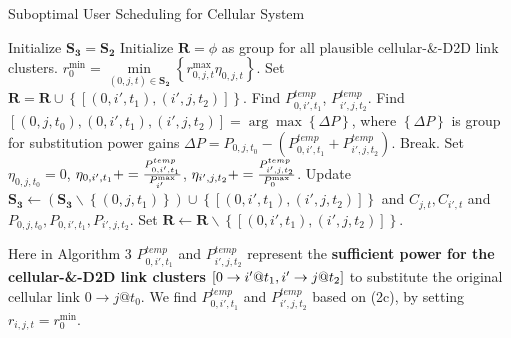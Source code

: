 \documentclass{ieeeaccess}
\begin{document}
\begin{algorithm}[!h]
\caption{Suboptimal User Scheduling for Cellular System}
\label{alg:1}
\begin{algorithmic}[1]
\STATE Initialize ${{\mathbf{S}}_{\mathbf{3}}}={{\mathbf{S}}_{\mathbf{2}}}$
  \STATE Initialize ${\mathbf{R}} = \phi $ as group for all plausible cellular-\&-D2D link clusters.
  \STATE $r_0^{\min } = \mathop {\min }\limits_{\left( {0,j,t} \right) \in {{\mathbf{S}}_{\mathbf{2}}}} \left\{ {r_{0,j,t}^{\max }{\eta _{0,j,t}}} \right\}$.
            \STATE Set ${\mathbf{R = R}} \cup \left\{ {\left[ {\left( {0,i',{t_1}} \right),\left( {i',j,{t_2}} \right)} \right]} \right\}$.
          \ENDIF
        \ENDFOR
      \ENDIF
    \ENDFOR
  \ENDFOR
    \STATE Find ${P_{0,i',{t_1}}^{temp}}$, ${P_{i',j,{t_2}}^{temp}}$. 
    \STATE Find $\left[ {\left( {0,j,{t_0}} \right),\left( {0,i',{t_1}} \right),\left( {i',j,{t_2}} \right)} \right] = \arg \max \left\{ {\Delta P} \right\}$, where ${\left\{ {\Delta P} \right\}}$ is group for substitution power gains $\Delta P = {P_{0,j,{t_0}}} - \left( {{P_{0,i',{t_1}}^{temp}} + {P_{i',j,{t_2}}^{temp}}} \right)$. 
      \STATE Break.
    \ENDIF
    \STATE Set ${\eta _{0,j,{t_0}} = 0}$, ${\eta _{0,i',{t_1}}} += \frac{{{P_{0,i',{t_1}}^{{\rm{temp}}}}}}{{P_{i'}^{\max }}}$, ${\eta _{i',j,{t_2}}} += \frac{{{P_{i',j,{t_2}}^{{\rm{temp}}}}}}{{P_{0}^{\max }}}$.
    \STATE Update ${{\mathbf{S}}_{\mathbf{3}}} \leftarrow \left( {{{\mathbf{S}}_{\mathbf{3}}}\backslash \left\{ {\left( {0,j,{t_1}} \right)} \right\}} \right) \cup \left\{ {\left[ {\left( {0,i',{t_1}} \right),\left( {i',j,{t_2}} \right)} \right]} \right\}$ and ${C_{j,t}},{C_{i',t}}$ and ${P_{0,j,{t_0}}},{P_{0,i',{t_1}}},{P_{i',j,{t_2}}}$.
    \STATE Set $\mathbf{R} \leftarrow \mathbf{R}\backslash \left\{ {\left[ {\left( {0,i',{t_1}} \right),\left( {i',j,{t_2}} \right)} \right]} \right\}$.
  \ENDWHILE
\ENDFOR
\end{algorithmic}
\end{algorithm}
Here in Algorithm 3 ${P_{0,i',{t_1}}^{temp}}$ and ${P_{i',j,{t_2}}^{temp}}$ represent the \textbf{sufficient power for the  cellular-\&-D2D link clusters} $\left[ {{\rm{0}} \to i'@{t_1},i' \to j@{t_2}} \right]$ to substitute the original cellular link $0 \to j @{t_0}$. We find ${P_{0,i',{t_1}}^{temp}}$ and ${P_{i',j,{t_2}}^{temp}}$ based on (2c), by setting ${r_{i,j,t}} = r_0^{\min }$.
\end{document}
